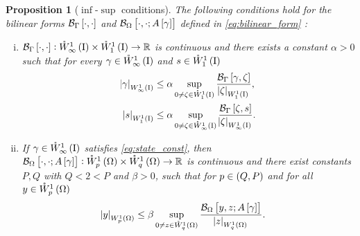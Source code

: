 \documentclass[final]{siamltex}
\newtheorem{prop}[theorem]{Proposition}
\begin{document}
\begin{prop}[$\inf$-$\sup$ conditions]\label{prop:b_infsup} The following conditions hold for the bilinear forms ${{\mathcal{B}}_\Gamma}\sbr{\cdot,\cdot}$ and ${{\mathcal{B}}_\Omega}\sbr{\cdot,\cdot;A\sbr{\gamma}}$ defined in \eqref{eq:bilinear_form} :
\begin{enumerate}[(i)]
\item\label{item:b_infsup_i} ${{\mathcal{B}}_\Gamma}\sbr{\cdot,\cdot}:{{\mathring{W}^{1}_{\infty}\del{{\text{\rm I}}}}} \times {{\mathring{W}^{1}_{1}\del{{\text{\rm I}}}}} \to {\mathbb{R}}$  is continuous and there exists a constant $\alpha > 0$ such that  for every $\gamma \in {{\mathring{W}^{1}_{\infty}\del{{\text{\rm I}}}}}$ and $s \in {{\mathring{W}^{1}_{1}\del{{\text{\rm I}}}}}$
	\begin{subequations}
		\begin{align}\label{eq:b1_infsup_a}
			{\abs{{\gamma}}_{{W^{{{1}}}_{{{\infty}}}\del{{\text{\rm I}}}}}} &\leq \alpha \sup_{0\neq \zeta\in{{\mathring{W}^{{1}}_{{1}}\del{{\text{\rm I}}}}}}
				\frac{{{\mathcal{B}}_\Gamma}\sbr{\gamma,\zeta}}{{\abs{{\zeta}}_{{W^{{{1}}}_{{{1}}}\del{{\text{\rm I}}}}}}} ,  \\
			\label{eq:b1_infsup_b}
			{\abs{{s}}_{{W^{{{1}}}_{{{1}}}\del{{\text{\rm I}}}}}} &\leq \alpha \sup_{0\neq \zeta\in{{\mathring{W}^{{1}}_{{\infty}}\del{{\text{\rm I}}}}}}
				\frac{{{\mathcal{B}}_\Gamma}\sbr{\zeta,s}}{{\abs{{\zeta}}_{{W^{{{1}}}_{{{\infty}}}\del{{\text{\rm I}}}}}}} . 
		\end{align}
	\end{subequations}
\item\label{item:b_infsup_ii} If $\gamma \in {{\mathring{W}^{{1}}_{{\infty}}\del{{\text{\rm I}}}}}$ satisfies \eqref{eq:state_const}, then ${{\mathcal{B}}_\Omega}\sbr{\cdot,\cdot;A\sbr{\gamma}}:{{\mathring{W}^{1}_{p}\del{\Omega}}}\times{{\mathring{W}^{1}_{q}\del{\Omega}}}\to{\mathbb{R}}$ is continuous and there exist constants $P,Q$ with  $Q < 2 < P$ and $\beta > 0$, such that for $p \in \intoo{Q,P}$ and for all $y \in {{\mathring{W}^{1}_{p}\del{\Omega}}}$ 
	\begin{align}\label{eq:b2_infsup}
		{\abs{{y}}_{{W^{{{1}}}_{{{p}}}\del{{{\Omega}}}}}} &\leq \beta \sup_{0\neq z\in
		{{\mathring{W}^{{1}}_{{q}}\del{{\Omega}}}}}\frac{{{\mathcal{B}}_\Omega}\sbr{y,z;A\sbr{\gamma}}}{{\abs{{z}}_{{W^{{{1}}}_{{{q}}}\del{{{\Omega}}}}}}}.
        \end{align}
\end{enumerate}	
\end{prop}
\end{document}
